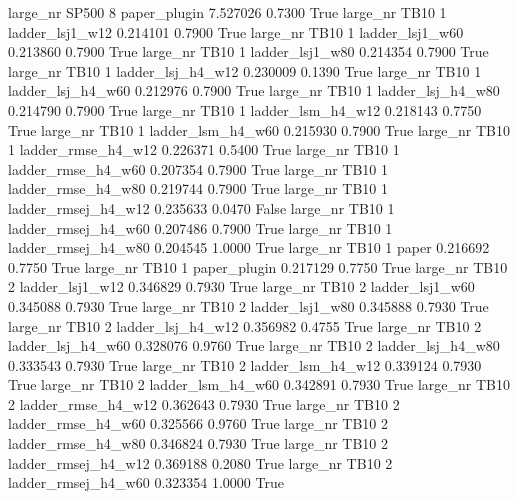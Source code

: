   large_nr    SP500                 8        paper_plugin   7.527026      0.7300    True
  large_nr     TB10                 1     ladder_lsj1_w12   0.214101      0.7900    True
  large_nr     TB10                 1     ladder_lsj1_w60   0.213860      0.7900    True
  large_nr     TB10                 1     ladder_lsj1_w80   0.214354      0.7900    True
  large_nr     TB10                 1   ladder_lsj_h4_w12   0.230009      0.1390    True
  large_nr     TB10                 1   ladder_lsj_h4_w60   0.212976      0.7900    True
  large_nr     TB10                 1   ladder_lsj_h4_w80   0.214790      0.7900    True
  large_nr     TB10                 1   ladder_lsm_h4_w12   0.218143      0.7750    True
  large_nr     TB10                 1   ladder_lsm_h4_w60   0.215930      0.7900    True
  large_nr     TB10                 1  ladder_rmse_h4_w12   0.226371      0.5400    True
  large_nr     TB10                 1  ladder_rmse_h4_w60   0.207354      0.7900    True
  large_nr     TB10                 1  ladder_rmse_h4_w80   0.219744      0.7900    True
  large_nr     TB10                 1 ladder_rmsej_h4_w12   0.235633      0.0470   False
  large_nr     TB10                 1 ladder_rmsej_h4_w60   0.207486      0.7900    True
  large_nr     TB10                 1 ladder_rmsej_h4_w80   0.204545      1.0000    True
  large_nr     TB10                 1               paper   0.216692      0.7750    True
  large_nr     TB10                 1        paper_plugin   0.217129      0.7750    True
  large_nr     TB10                 2     ladder_lsj1_w12   0.346829      0.7930    True
  large_nr     TB10                 2     ladder_lsj1_w60   0.345088      0.7930    True
  large_nr     TB10                 2     ladder_lsj1_w80   0.345888      0.7930    True
  large_nr     TB10                 2   ladder_lsj_h4_w12   0.356982      0.4755    True
  large_nr     TB10                 2   ladder_lsj_h4_w60   0.328076      0.9760    True
  large_nr     TB10                 2   ladder_lsj_h4_w80   0.333543      0.7930    True
  large_nr     TB10                 2   ladder_lsm_h4_w12   0.339124      0.7930    True
  large_nr     TB10                 2   ladder_lsm_h4_w60   0.342891      0.7930    True
  large_nr     TB10                 2  ladder_rmse_h4_w12   0.362643      0.7930    True
  large_nr     TB10                 2  ladder_rmse_h4_w60   0.325566      0.9760    True
  large_nr     TB10                 2  ladder_rmse_h4_w80   0.346824      0.7930    True
  large_nr     TB10                 2 ladder_rmsej_h4_w12   0.369188      0.2080    True
  large_nr     TB10                 2 ladder_rmsej_h4_w60   0.323354      1.0000    True
